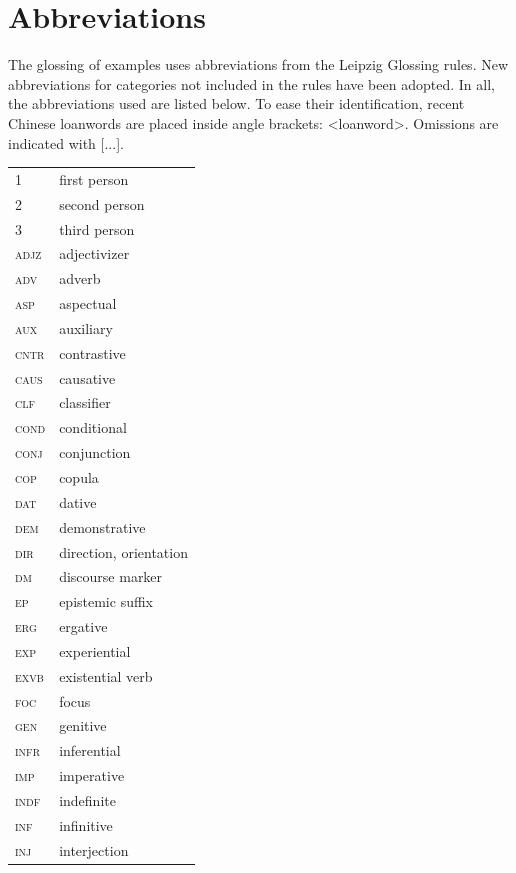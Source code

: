 \documentclass[output=paper,colorlinks,citecolor=brown]{langscibook}
\begin{document}
\section*{Abbreviations}
The glossing of examples uses abbreviations from the Leipzig Glossing rules. New abbreviations for categories not included in the rules have been adopted. In all, the abbreviations used are listed below. To ease their identification, recent Chinese loanwords are placed inside angle brackets: <loanword>. Omissions are indicated with [...].\medskip\noindent


\begin{tabularx}{.45\textwidth}{lQ} %
 \scshape 1 & first person\\
 \scshape 2 & second person \\
 \scshape 3 & third person\\
 \scshape adjz  & adjectivizer\\
 \scshape adv  & adverb\\
 \scshape asp  & aspectual\\
 \scshape aux  & auxiliary\\
 \scshape cntr  & contrastive\\
 \scshape caus  & causative\\
 \scshape clf  & classifier\\
 \scshape cond  & conditional\\
 \scshape conj  & conjunction\\
 \scshape cop  & copula\\
 \scshape dat  & dative\\
 \scshape dem  & demonstrative\\
 \scshape dir  & direction, orientation \\
 \scshape dm  & discourse marker\\
 \scshape ep  & epistemic suffix\\
 \scshape erg  & ergative\\
 \scshape exp  & experiential\\
 \scshape exvb  & existential verb\\
 \scshape foc  & focus\\
 \scshape gen  & genitive\\
 \scshape infr  & inferential \\
 \scshape imp  & imperative\\
 \scshape indf  & indefinite\\
 \scshape inf  & infinitive\\
 \scshape inj  & interjection\\
\end{tabularx}
\end{document}
